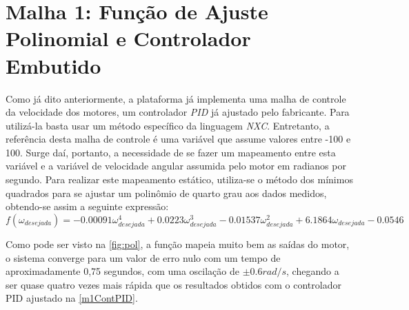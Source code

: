 \section{Malha 1: Função de Ajuste Polinomial e Controlador Embutido}
\label{m1ContPol}
Como já dito anteriormente, a plataforma já implementa uma malha de controle da velocidade dos motores, um controlador \emph{PID} já ajustado pelo fabricante. Para utilizá-la basta usar um método específico da linguagem \emph{NXC}. Entretanto, a referência desta malha de controle é uma variável que assume valores entre -100 e 100. Surge daí, portanto, a necessidade de se fazer um mapeamento entre esta variável e a variável de velocidade angular assumida pelo motor em radianos por segundo. Para realizar este mapeamento estático, utiliza-se o método dos mínimos quadrados para se ajustar um polinômio de quarto grau aos dados medidos, obtendo-se assim a seguinte expressão:%
\begin{equation}
f(\omega_{desejada}) = -0.00091\omega_{desejada}^{4} + 0.0223\omega_{desejada}^{3} - 0.01537\omega_{desejada}^{2} + 6.1864\omega_{desejada} - 0.0546
\label{eq:pol}
\end{equation} 
 
 Como pode ser visto na \autoref{fig:pol}, a função mapeia muito bem as saídas do motor, o sistema converge para um valor de erro nulo com um tempo de aproximadamente 0,75 segundos, com uma oscilação de $\pm0.6 rad/s$, chegando a ser quase quatro vezes mais rápida que os resultados obtidos com o controlador PID ajustado na \autoref{m1ContPID}.  %
 
